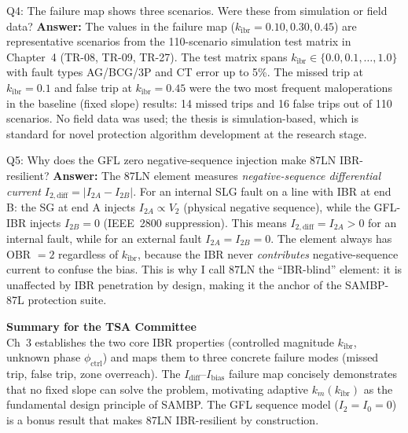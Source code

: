\documentclass[12pt,a4paper]{article}
\newcommand{\kibr}{k_\mathrm{ibr}}
\newcommand{\km}{k_m}
\newcommand{\phictrl}{\phi_\mathrm{ctrl}}
\begin{document}
\begin{keybox}{Q4: The failure map shows three scenarios. Were these from simulation or field data?}
\textbf{Answer:}  The values in the failure map ($\kibr = 0.10, 0.30, 0.45$) are
representative scenarios from the 110-scenario simulation test matrix in Chapter~4
(TR-08, TR-09, TR-27).  The test matrix spans $\kibr \in \{0.0, 0.1, \ldots, 1.0\}$
with fault types AG/BCG/3P and CT error up to 5\%.  The missed trip at $\kibr = 0.1$
and false trip at $\kibr = 0.45$ were the two most frequent maloperations in the
baseline (fixed slope) results: 14 missed trips and 16 false trips out of 110
scenarios.  No field data was used; the thesis is simulation-based, which is standard
for novel protection algorithm development at the research stage.
\end{keybox}

\begin{keybox}{Q5: Why does the GFL zero negative-sequence injection make 87LN IBR-resilient?}
\textbf{Answer:}  The 87LN element measures \emph{negative-sequence differential current}
$I_{2,\mathrm{diff}} = |I_{2A} - I_{2B}|$.  For an internal SLG fault on a line with
IBR at end B: the SG at end A injects $I_{2A} \propto V_2$ (physical negative sequence),
while the GFL-IBR injects $I_{2B} = 0$ (IEEE~2800 suppression).  This means
$I_{2,\mathrm{diff}} = I_{2A} > 0$ for an internal fault, while for an external fault
$I_{2A} = I_{2B} = 0$.  The element always has OBR $= 2$ regardless of $\kibr$, because
the IBR never \emph{contributes} negative-sequence current to confuse the bias.
This is why I call 87LN the ``IBR-blind'' element: it is unaffected by IBR penetration
by design, making it the anchor of the SAMBP-87L protection suite.
\end{keybox}

\vspace{1em}
\begin{tcolorbox}[colback=iitmnavy!5,colframe=iitmnavy,arc=3pt,boxrule=1pt]
\small\centering
\textbf{Summary for the TSA Committee}\\[3pt]
Ch~3 establishes the two core IBR properties (controlled magnitude $\kibr$, unknown phase
$\phictrl$) and maps them to three concrete failure modes (missed trip, false trip, zone
overreach).  The $I_\mathrm{diff}$--$I_\mathrm{bias}$ failure map concisely demonstrates
that no fixed slope can solve the problem, motivating adaptive $\km(\kibr)$ as the
fundamental design principle of SAMBP.  The GFL sequence model ($I_2 = I_0 = 0$) is a
bonus result that makes 87LN IBR-resilient by construction.
\end{tcolorbox}
\end{document}
